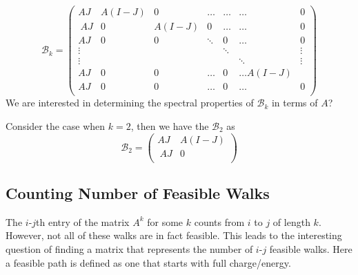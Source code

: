 \documentclass[envcountsame]{llncs}
\begin{document}
\begin{equation*}
\mathcal{B}_k = \begin{pmatrix}
 AJ & A(I-J) & 0& \dots& \dots& \dots& 0\\\
AJ & 0 & A(I-J) &0& \dots& \dots &0 \\
 AJ & 0 &0 & \ddots &0& \dots &0 \\
\vdots & & & & \ddots & & \vdots\\
\vdots & & & &  & \ddots & \vdots\\
AJ& 0 &0 & \dots &0& \dots A(I-J)\\
 AJ& 0 &0 & \dots &0& \dots &0\\
\end{pmatrix}
\end{equation*}
We are interested in determining the spectral properties of $\mathcal{B}_k$ in terms of $A$?

Consider the case when $k=2$, then we have the $\mathcal{B}_2$ as
\begin{equation*}
\mathcal{B}_2 = \begin{pmatrix}
A J & A(I-J)\\\
 AJ & 0 \\
\end{pmatrix}
\end{equation*}

\subsection{Counting Number of Feasible Walks}
The $i$-$j$th entry of the matrix $A^k$ for some $k$ counts from $i$ to $j$ of length $k$. However, not all of these walks are in fact feasible. This leads to the interesting question of finding a matrix that represents the number of $i$-$j$ feasible walks. Here a feasible path is defined as one that starts with full charge/energy.
\end{document}
